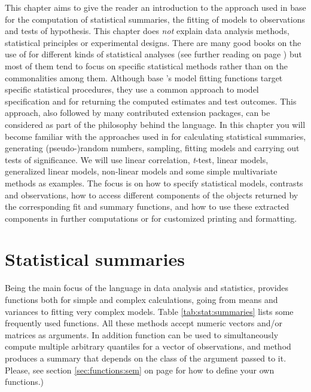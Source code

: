 \documentclass[krantz2]{krantz}\usepackage{knitr}
\begin{document}
This chapter aims to give the reader an introduction to the approach used in base \Rlang for the computation of statistical summaries, the fitting of models to observations and tests of hypothesis. This chapter does \emph{not} explain data analysis methods, statistical principles or experimental designs. There are many good books on the use of \Rpgrm for different kinds of statistical analyses (see further reading on page \pageref{sec:stat:further:reading}) but most of them tend to focus on specific statistical methods rather than on the commonalities among them. Although base \R's model fitting functions target specific statistical procedures, they use a common approach to model specification and for returning the computed estimates and test outcomes. This approach, also followed by many contributed extension packages, can be considered as part of the philosophy behind the \Rlang language. In this chapter you will become familiar with the approaches used in \Rlang for calculating statistical summaries, generating (pseudo-)random numbers, sampling, fitting models and carrying out tests of significance. We will use linear correlation, \emph{t}-test, linear models, generalized linear models, non-linear models and some simple multivariate methods as examples. The focus is on how to specify statistical models, contrasts and observations, how to access different components of the objects returned by the corresponding fit and summary functions, and how to use these extracted components in further computations or for customized printing and formatting.

\section{Statistical summaries}
Being the main focus of the \Rlang language in data analysis and statistics, \Rlang provides functions both for simple and complex calculations, going from means and variances to fitting very complex models. Table \ref{tab:stat:summaries} lists some frequently used functions.  All these methods accept numeric vectors and/or matrices as arguments. In addition function  can be used to simultaneously compute multiple arbitrary quantiles for a vector of observations, and method  produces a summary that depends on the class of the argument passed to it. Please, see section \ref{sec:functions:sem} on page \pageref{sec:functions:sem} for how to define your own functions.)
\end{document}
